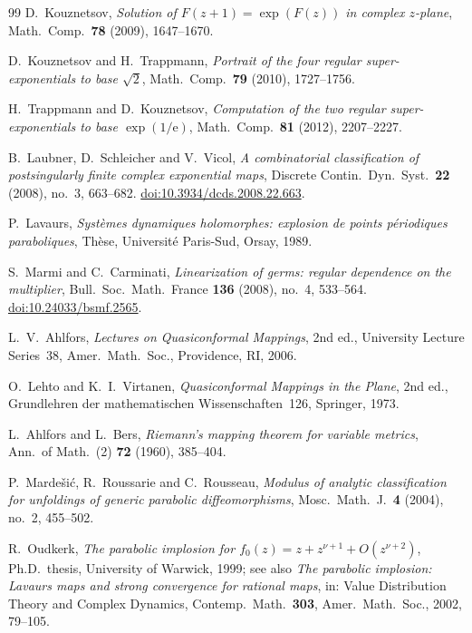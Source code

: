 \documentclass[11pt]{amsart}
\theoremstyle{definition}
\newcommand{\eee}{\mathrm{e}}
\begin{document}
\begin{thebibliography}{99}
D.~Kouznetsov,
\emph{Solution of $F(z+1)=\exp(F(z))$ in complex $z$-plane},
Math.\ Comp.\ \textbf{78} (2009), 1647--1670.

D.~Kouznetsov and H.~Trappmann,
\emph{Portrait of the four regular super-exponentials to base $\sqrt2$},
Math.\ Comp.\ \textbf{79} (2010), 1727--1756.

H.~Trappmann and D.~Kouznetsov,
\emph{Computation of the two regular super-exponentials to base
$\exp(1/\eee)$},
Math.\ Comp.\ \textbf{81} (2012), 2207--2227.

B.~Laubner, D.~Schleicher and V.~Vicol,
\emph{A combinatorial classification of postsingularly finite complex
exponential maps},
Discrete Contin.\ Dyn.\ Syst.\ \textbf{22} (2008), no.~3, 663--682.
\href{https://doi.org/10.3934/dcds.2008.22.663}{doi:10.3934/dcds.2008.22.663}.

P.~Lavaurs,
\emph{Syst\`emes dynamiques holomorphes: explosion de points p\'eriodiques
paraboliques}, Th\`ese, Universit\'e Paris-Sud, Orsay, 1989.

S.~Marmi and C.~Carminati,
\emph{Linearization of germs: regular dependence on the multiplier},
Bull.\ Soc.\ Math.\ France \textbf{136} (2008), no.~4, 533--564.
\href{https://doi.org/10.24033/bsmf.2565}{doi:10.24033/bsmf.2565}.

L.~V.~Ahlfors,
\emph{Lectures on Quasiconformal Mappings}, 2nd ed.,
University Lecture Series~38, Amer.\ Math.\ Soc., Providence, RI, 2006.

O.~Lehto and K.~I.~Virtanen,
\emph{Quasiconformal Mappings in the Plane}, 2nd ed.,
Grundlehren der mathematischen Wissenschaften~126, Springer, 1973.

L.~Ahlfors and L.~Bers,
\emph{Riemann's mapping theorem for variable metrics},
Ann.\ of Math.\ (2) \textbf{72} (1960), 385--404.

P.~Marde\v{s}i\'c, R.~Roussarie and C.~Rousseau,
\emph{Modulus of analytic classification for unfoldings of generic parabolic
diffeomorphisms},
Mosc.\ Math.\ J.\ \textbf{4} (2004), no.~2, 455--502.

R.~Oudkerk,
\emph{The parabolic implosion for
$f_0(z)=z+z^{\nu+1}+O(z^{\nu+2})$},
Ph.D.\ thesis, University of Warwick, 1999;
see also \emph{The parabolic implosion: Lavaurs maps and strong convergence for
rational maps}, in: Value Distribution Theory and Complex Dynamics,
Contemp.\ Math.\ \textbf{303}, Amer.\ Math.\ Soc., 2002, 79--105.


\end{thebibliography}
\end{document}
